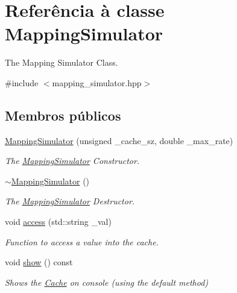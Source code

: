 \hypertarget{classMappingSimulator}{}\section{Referência à classe Mapping\+Simulator}
\label{classMappingSimulator}


The Mapping Simulator Class.  




{\ttfamily \#include $<$mapping\+\_\+simulator.\+hpp$>$}

\subsection*{Membros públicos}
\begin{DoxyCompactItemize}
\item 
\hyperlink{classMappingSimulator_a022509080806df80931c6de24775ca84}{Mapping\+Simulator} (unsigned \+\_\+cache\+\_\+sz, double \+\_\+max\+\_\+rate)
\begin{DoxyCompactList}\small\item\em The \hyperlink{classMappingSimulator}{Mapping\+Simulator} Constructor. \end{DoxyCompactList}\item 
\hyperlink{classMappingSimulator_a9bafb8500fde4efe045ce74510fe7a7f}{$\sim$\+Mapping\+Simulator} ()\hypertarget{classMappingSimulator_a9bafb8500fde4efe045ce74510fe7a7f}{}\label{classMappingSimulator_a9bafb8500fde4efe045ce74510fe7a7f}

\begin{DoxyCompactList}\small\item\em The \hyperlink{classMappingSimulator}{Mapping\+Simulator} Destructor. \end{DoxyCompactList}\item 
void \hyperlink{classMappingSimulator_abe970a1be860a710964e25a193d737d9}{access} (std\+::string \+\_\+val)
\begin{DoxyCompactList}\small\item\em Function to access a value into the cache. \end{DoxyCompactList}\item 
void \hyperlink{classMappingSimulator_ad8c16e3840b4228aa36d5606e6d7abf0}{show} () const \hypertarget{classMappingSimulator_ad8c16e3840b4228aa36d5606e6d7abf0}{}\label{classMappingSimulator_ad8c16e3840b4228aa36d5606e6d7abf0}

\begin{DoxyCompactList}\small\item\em Shows the \hyperlink{classCache}{Cache} on console (using the default method) \end{DoxyCompactList}\end{DoxyCompactItemize}
